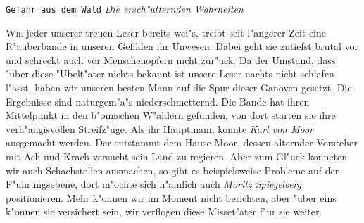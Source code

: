 \texttt{\Huge Gefahr aus dem Wald}
	\newline
\textit{\Large Die ersch"utternden Wahrheiten}
\normalsize

\begin{adjmulticols*}{3}{0pt}{0in}
 	\lettrine{W}{ie} jeder unserer treuen Leser bereits wei"s, treibt seit l"angerer Zeit eine R"auberbande in unseren Gefilden ihr Unwesen. Dabei geht sie zutiefst brutal vor und schreckt auch vor Menschenopfern nicht zur"uck.
 	Da der Umstand, dass "uber diese "Ubelt"ater nichts bekannt ist unsere Leser nachts nicht schlafen l"asst, haben wir unseren besten Mann auf die Spur dieser Ganoven gesetzt. Die Ergebnisse sind naturgem"a"s niederschmetternd.
 	Die Bande hat ihren Mittelpunkt in den b"omischen W"aldern gefunden, von dort starten sie ihre verh"angisvollen Streifz"uge. Als ihr Hauptmann konnte \textit{Karl von Moor} ausgemacht werden. Der entstammt dem Hause Moor, dessen alternder Vorsteher mit Ach und Krach versucht sein Land zu regieren.
 	Aber zum Gl"uck konneten wir auch Schachstellen ausmachen, so gibt es beispielsweise Probleme auf der F"uhrungsebene, dort m"ochte sich n"amlich auch \textit{Moritz Spiegelberg} positionieren.
 	Mehr k"onnen wir im Moment nicht berichten, aber "uber eins k"onnen sie versichert sein, wir verflogen diese Misset"ater f"ur sie weiter.
\end{adjmulticols*}